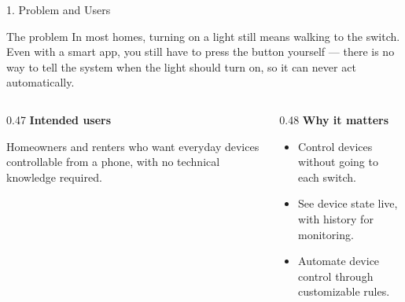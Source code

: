 \documentclass[aspectratio=169,11pt]{beamer}
\begin{document}
\begin{frame}{1. Problem and Users}
  \small
  \begin{block}{The problem}
    In most homes, turning on a light still means walking to the switch.
    Even with a smart app, you still have to press the button yourself ---
    there is no way to tell the system when the light should turn on, so it
    can never act automatically.
  \end{block}
  \vspace{0.1cm}
  \small
  \begin{columns}[T,onlytextwidth]
    \begin{column}{0.47\textwidth}
      {\large\bfseries\color{DeepBlue} Intended users}\par
      Homeowners and renters who want everyday devices controllable from a phone, with no technical knowledge required.
    \end{column}
    \begin{column}{0.48\textwidth}
      {\large\bfseries\color{DeepBlue} Why it matters}\par
      \begin{itemize}
        \item Control devices without going to each switch.
        \item See device state live, with history for monitoring.
        \item Automate device control through customizable rules.
      \end{itemize}
    \end{column}
  \end{columns}
\end{frame}
\end{document}

